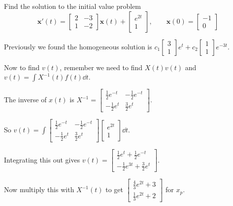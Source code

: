 \documentclass[../diffeq.tex]{subfiles}
\begin{document}
\pagebreak
\begin{example}
    Find the solution to the initial value problem 
    \[ \textbf{x}'(t)=\begin{bmatrix}
        2 & -3 \\
        1 & -2 
    \end{bmatrix}\textbf{x}(t)+\begin{bmatrix}
        e^{2t}\\ 1
    \end{bmatrix}, \qquad \textbf{x}(0)=\begin{bmatrix}
        -1 \\ 0
    \end{bmatrix}\]

    Previously we found the homogeneous solution is $c_1\begin{bmatrix}
        3\\1
    \end{bmatrix}e^t+c_2\begin{bmatrix}
        1\\1
    \end{bmatrix}e^{-3t}$.

    Now to find $v(t)$, remember we need to find $X(t)v(t)$ and $v(t)=\int X^{-1}(t)f(t)\dd t$.

    The inverse of $x(t)$ is $X^{-1}=\begin{bmatrix}
        \frac{1}{2}e^{-t} & -\frac{1}{2}e^{-t}\\
        -\frac{1}{2}e^t & \frac{3}{2}e^t
    \end{bmatrix}$.

    So $v(t)=\int \begin{bmatrix}
        \frac{1}{2}e^{-t} & -\frac{1}{2}e^{-t}\\
        -\frac{1}{2}e^{t} & \frac{3}{2}e^t
    \end{bmatrix}\begin{bmatrix}
        e^{2t}\\1
    \end{bmatrix}\dd t$.

    Integrating this out gives $v(t)=\begin{bmatrix}
        \frac{1}{2}e^t+\frac{1}{2}e^{-t}\\
        -\frac{1}{2}e^{3t}+\frac{3}{2}e^t
    \end{bmatrix}$.

    Now multiply this with $X^{-1}(t)$ to get $\begin{bmatrix}
        \frac{4}{3}e^{2t}+3\\
        \frac{1}{3}e^{2t}+2
    \end{bmatrix}$ for $x_p$.


\end{example}
\end{document}
